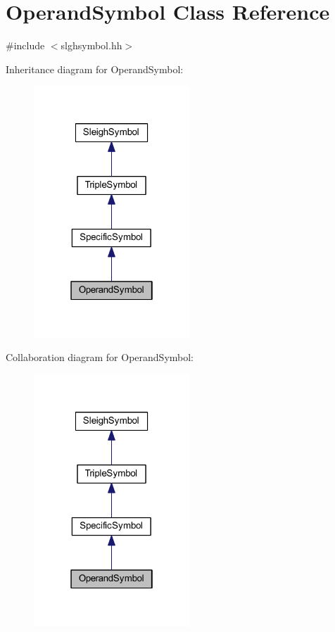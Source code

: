 \hypertarget{class_operand_symbol}{}\section{Operand\+Symbol Class Reference}
\label{class_operand_symbol}


{\ttfamily \#include $<$slghsymbol.\+hh$>$}



Inheritance diagram for Operand\+Symbol\+:
\nopagebreak
\begin{figure}[H]
\begin{center}
\leavevmode
\includegraphics[width=166pt]{class_operand_symbol__inherit__graph}
\end{center}
\end{figure}


Collaboration diagram for Operand\+Symbol\+:
\nopagebreak
\begin{figure}[H]
\begin{center}
\leavevmode
\includegraphics[width=166pt]{class_operand_symbol__coll__graph}
\end{center}
\end{figure}
